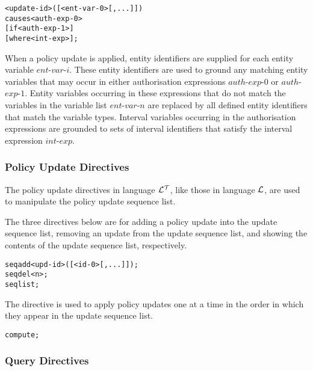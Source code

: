 \documentclass[11pt]{report}
\newenvironment{vverbatim}
{
  \begin{alltt}
}
{
    \vspace{-\baselineskip}
  \end{alltt}
}
\begin{document}
          \begin{vverbatim}
  <update-id>([<ent-var-0>[, ...]])
    causes <auth-exp-0>
    [if <auth-exp-1>]
    [where <int-exp>];
          \end{vverbatim}

          When a policy update is applied, entity identifiers are supplied for
          each entity variable $ent$-$var$-$i$. These entity identifiers are
          used to ground any matching entity variables that may occur in either
          authorisation expressions $auth$-$exp$-$0$ or $auth$-$exp$-$1$.
          Entity variables occurring in these expressions that do not match
          the variables in the variable list $ent$-$var$-$n$ are replaced by
          all defined entity identifiers that match the variable types.
          Interval variables occurring in the authorisation expressions are
          grounded to sets of interval identifiers that satisfy the interval
          expression $int$-$exp$.

        \subsubsection{Policy Update Directives}

          The policy update directives in language ${\cal L^T}$, like those
          in language ${\cal L}$, are used to manipulate the policy update
          sequence list.

          The three directives below are for adding a policy update into the
          update sequence list, removing an update from the update sequence
          list, and showing the contents of the update sequence list,
          respectively.

          \begin{vverbatim}
  seq add <upd-id>([<id-0>[, ...]]);
  seq del <n>;
  seq list;
          \end{vverbatim}

          The directive is used to apply policy updates one at a time in the
          order in which they appear in the update sequence list.

          \begin{vverbatim}
  compute;
          \end{vverbatim}

        \subsubsection{Query Directives}
\end{document}
